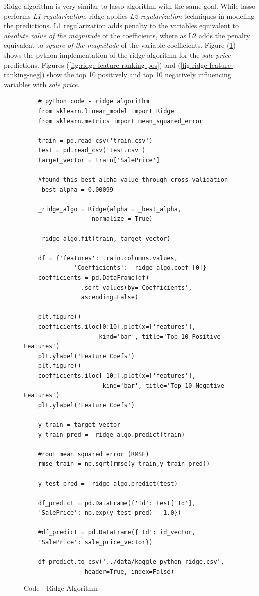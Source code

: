 \documentclass[sigconf]{acmart}
\begin{document}
	Ridge algorithm is very similar to lasso algorithm with the same goal. While lasso performs {\em L1 regularization}, ridge applies {\em L2 regularization} techniques in modeling the predictions. L1 regularization adds penalty to the variables equivalent to {\em absolute value of the magnitude} of the coefficients, where as L2 adds the penalty equivalent to {\em square of the magnitude} of the variable coefficients. Figure (\ref{c:ridge}) shows the python implementation of the ridge algorithm for the {\em sale price} predictions. Figures ({\ref{fig:ridge-feature-ranking-pos}}) and (\ref{fig:ridge-feature-ranking-neg}) show the top 10 positively and top 10 negatively influencing variables with {\em sale price}.
		
	\begin{figure}[htb]
	\begin{verbatim}
	# python code - ridge algorithm
	from sklearn.linear_model import Ridge
	from sklearn.metrics import mean_squared_error
	
	train = pd.read_csv('train.csv')
	test = pd.read_csv('test.csv')
	target_vector = train['SalePrice']
	
	#found this best alpha value through cross-validation
	_best_alpha = 0.00099
	
	_ridge_algo = Ridge(alpha = _best_alpha, 
	               normalize = True)		
	               	
	_ridge_algo.fit(train, target_vector)   
	
	df = {'features': train.columns.values, 
	          'Coefficients': _ridge_algo.coef_[0]}	          
	coefficients = pd.DataFrame(df)
	            .sort_values(by='Coefficients', 
	            ascending=False)
	            
	plt.figure()
	coefficients.iloc[0:10].plot(x=['features'], 
	                 kind='bar', title='Top 10 Positive Features')	                 
	plt.ylabel('Feature Coefs')	
	plt.figure()
	coefficients.iloc[-10:].plot(x=['features'], 
	                  kind='bar', title='Top 10 Negative Features')
	plt.ylabel('Feature Coefs')
	
	y_train = target_vector
	y_train_pred = _ridge_algo.predict(train)
	
	#root mean squared error (RMSE)
	rmse_train = np.sqrt(rmse(y_train,y_train_pred))	
	
	y_test_pred = _ridge_algo.predict(test)
	
	df_predict = pd.DataFrame({'Id': test['Id'], 
	'SalePrice': np.exp(y_test_pred) - 1.0})
	
	#df_predict = pd.DataFrame({'Id': id_vector, 
	'SalePrice': sale_price_vector})
	
	df_predict.to_csv('../data/kaggle_python_ridge.csv',
				 header=True, index=False)	
	\end{verbatim}
	\caption{Code - Ridge Algorithm} \label{c:ridge} 
	\end{figure}
		
\end{document}
